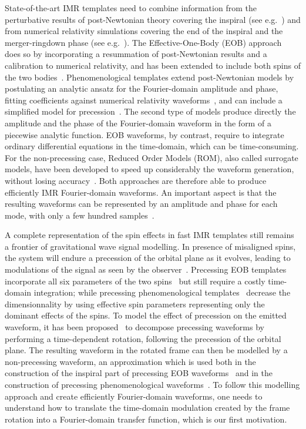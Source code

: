 \documentclass[aps,showpacs,twocolumn,
prd,superscriptaddress,nofootinbib]{revtex4-1}
\begin{document}
State-of-the-art IMR templates need to combine information from the perturbative results of post-Newtonian theory covering the inspiral (see e.g.~\cite{BlanchetLiving}) and from numerical relativity simulations covering the end of the inspiral and the merger-ringdown phase (see e.g.~\cite{Pfeiffer12}). The Effective-One-Body (EOB) approach~\cite{BD99} does so by incorporating a resummation of post-Newtonian results and a calibration to numerical relativity, and has been extended to include both spins of the two bodies~\cite{Taracchini+13, Pan+13, Bohe+16}. Phenomenological templates extend post-Newtonian models by postulating an analytic ansatz for the Fourier-domain amplitude and phase, fitting coefficients against numerical relativity waveforms~\cite{Husa+15, Khan+15}, and can include a simplified model for precession~\cite{Hannam+13}. The second type of models produce directly the amplitude and the phase of the Fourier-domain waveform in the form of a piecewise analytic function. EOB waveforms, by contrast, require to integrate ordinary differential equations in the time-domain, which can be time-consuming. For the non-precessing case, Reduced Order Models (ROM), also called surrogate models, have been developed to speed up considerably the waveform generation, without losing accuracy~\cite{Field+13, Puerrer14, Bohe+16}. Both approaches are therefore able to produce efficiently IMR Fourier-domain waveforms. An important aspect is that the resulting waveforms can be represented by an amplitude and phase for each mode, with only a few hundred samples~\cite{Puerrer14}.

A complete representation of the spin effects in fast IMR templates still remains a frontier of gravitational wave signal modelling. In presence of misaligned spins, the system will endure a precession of the orbital plane as it evolves, leading to modulations of the signal as seen by the observer~\cite{ACST94}. Precessing EOB templates incorporate all six parameters of the two spins~\cite{Pan+13, BTB16} but still require a costly time-domain integration; while precessing phenomenological templates~\cite{Hannam+13} decrease the dimensionnality by using effective spin parameters representing only the dominant effects of the spins. To model the effect of precession on the emitted waveform, it has been proposed~\cite{BCV03b, BCPTV05, Schmidt+10, OShaughnessy+11, Boyle+11} to decompose precessing waveforms by performing a time-dependent rotation, following the precession of the orbital plane. The resulting waveform in the rotated frame can then be modelled by a non-precessing waveform, an approximation which is used both in the construction of the inspiral part of precessing EOB waveforms~\cite{Pan+13} and in the construction of precessing phenomenological waveforms~\cite{Hannam+13}. To follow this modelling approach and create efficiently Fourier-domain waveforms, one needs to understand how to translate the time-domain modulation created by the frame rotation into a Fourier-domain transfer function, which is our first motivation.
\end{document}
